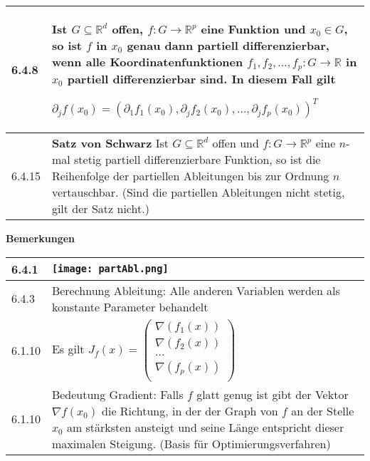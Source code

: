     \begin{longtable}{p{1cm} p{16cm}}
        \toprule

        6.4.8 & Ist $G \subseteq \mathbb{R}^d$ offen, $f: G \rightarrow \mathbb{R}^p$ eine Funktion und $x_0 \in G$, so ist $f$ in $x_0$
                genau dann partiell differenzierbar, wenn alle Koordinatenfunktionen $f_1, f_2, \dots, f_p : G\rightarrow \mathbb{R}$ in $x_0$
                partiell differenzierbar sind. In diesem Fall gilt \hfill \break
                \centerline{$ \partial_j f(x_0) = (\partial_1 f_1(x_0), \partial_j f_2(x_0), \dots, \partial_j f_p(x_0) )^T$} \\
        \midrule
        6.4.15& \textbf{Satz von Schwarz} \hfill \break
                Ist $G \subseteq \mathbb{R}^d$ offen und $f: G \rightarrow \mathbb{R}^p$ eine $n$-mal stetig partiell differenzierbare Funktion,
                so ist die Reihenfolge der partiellen Ableitungen bis zur Ordnung $n$ vertauschbar. \hfill \break
                (Sind die partiellen Ableitungen nicht stetig, gilt der Satz nicht.)\\ 

        \bottomrule
    \end{longtable}
    

    

    \noindent
    \textbf{Bemerkungen}
    
    \begin{longtable}{p{1cm} p{16cm}}
        \toprule

        6.4.1 & \texttt{[image: partAbl.png]} \\
        \midrule
        6.4.3 & Berechnung Ableitung: Alle anderen Variablen werden als konstante Parameter behandelt \\
        \midrule
        6.1.10& Es gilt $J_f(x)=    \begin{pmatrix}
                                    \nabla(f_1(x)) \\
                                    \nabla(f_2(x)) \\
                                    \dots \\
                                    \nabla(f_p(x)) \\
                                    \end{pmatrix}$ \\
        \midrule
        6.1.10& Bedeutung Gradient: Falls $f$ glatt genug ist gibt der Vektor $\nabla f(x_0)$ die Richtung, in der der Graph von $f$ an der Stelle
                $x_0$ am stärksten ansteigt und seine Länge entspricht dieser maximalen Steigung. (Basis für Optimierungsverfahren) \\

        \bottomrule
    \end{longtable}
    

